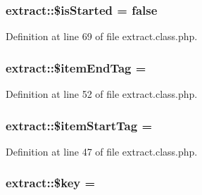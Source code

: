 \subsubsection[{\texorpdfstring{\$is\+Started}{$isStarted}}]{\setlength{\rightskip}{0pt plus 5cm}extract\+::\$is\+Started = false}\hypertarget{classextract_a609fc88642ae3bf1e27f0232f1b21171}{}\label{classextract_a609fc88642ae3bf1e27f0232f1b21171}


Definition at line 69 of file extract.\+class.\+php.

\subsubsection[{\texorpdfstring{\$item\+End\+Tag}{$itemEndTag}}]{\setlength{\rightskip}{0pt plus 5cm}extract\+::\$item\+End\+Tag = \textquotesingle{}\textquotesingle{}}\hypertarget{classextract_abddb079afc9c7c2f210e7793b93388e5}{}\label{classextract_abddb079afc9c7c2f210e7793b93388e5}


Definition at line 52 of file extract.\+class.\+php.

\subsubsection[{\texorpdfstring{\$item\+Start\+Tag}{$itemStartTag}}]{\setlength{\rightskip}{0pt plus 5cm}extract\+::\$item\+Start\+Tag = \textquotesingle{}\textquotesingle{}}\hypertarget{classextract_a11629128aedd1fc4b0a889640c693d0a}{}\label{classextract_a11629128aedd1fc4b0a889640c693d0a}


Definition at line 47 of file extract.\+class.\+php.

\subsubsection[{\texorpdfstring{\$key}{$key}}]{\setlength{\rightskip}{0pt plus 5cm}extract\+::\$key = \textquotesingle{}\textquotesingle{}}\hypertarget{classextract_a894aac7e47b9ed0773922aa7eb9ce578}{}\label{classextract_a894aac7e47b9ed0773922aa7eb9ce578}


